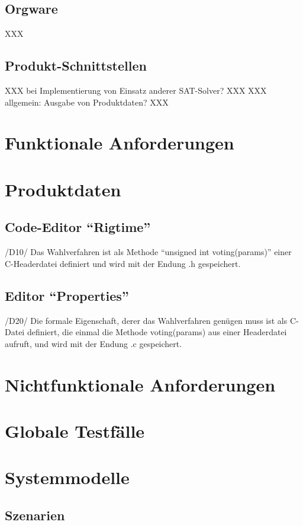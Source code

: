 \documentclass[a4paper]{scrreprt}
\begin{document}
\section{Orgware}
XXX

\section{Produkt-Schnittstellen}
XXX bei Implementierung von Einsatz anderer SAT-Solver? XXX
XXX allgemein: Ausgabe von Produktdaten? XXX


\chapter{Funktionale Anforderungen}


\chapter{Produktdaten}
\section{Code-Editor "`Rigtime"'}
/D10/ Das Wahlverfahren ist als Methode "`unsigned int voting(params)"' einer C-Headerdatei definiert und wird mit der Endung .h gespeichert.

\section{Editor "`Properties"'}
/D20/ Die formale Eigenschaft, derer das Wahlverfahren genügen muss ist als C-Datei definiert, die einmal die Methode voting(params) aus einer Headerdatei aufruft, und wird mit der Endung .c gespeichert.


\chapter{Nichtfunktionale Anforderungen}


\chapter{Globale Testfälle}


\chapter{Systemmodelle}
\section{Szenarien}
\end{document}
